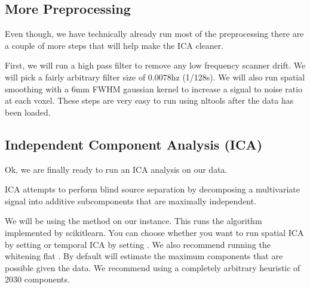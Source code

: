 \documentclass[letterpaper,10pt,english]{sphinxmanual}
\begin{document}
\subsection{More Preprocessing}
\label{\detokenize{content/ICA:more-preprocessing}}
Even though, we have technically already run most of the preprocessing there are a couple of more steps that will help make the ICA cleaner.

First, we will run a high pass filter to remove any low frequency scanner drift. We will pick a fairly arbitrary filter size of 0.0078hz (1/128s). We will also run spatial smoothing with a 6mm FWHM gaussian kernel to increase a signal to noise ratio at each voxel. These steps are very easy to run using nltools after the data has been loaded.

\begin{sphinxVerbatim}[commandchars=\\\{\}]
   

  
\end{sphinxVerbatim}


\subsection{Independent Component Analysis (ICA)}
\label{\detokenize{content/ICA:independent-component-analysis-ica}}
Ok, we are finally ready to run an ICA analysis on our data.

ICA attempts to perform blind source separation by decomposing a multivariate signal into additive subcomponents that are maximally independent.

We will be using the  method on our  instance. This runs the  algorithm implemented by scikit\sphinxhyphen{}learn. You can choose whether you want to run spatial ICA by setting  or temporal ICA by setting . We also recommend running the whitening flat . By default  will estimate the maximum components that are possible given the data. We recommend using a completely arbitrary heuristic of 20\sphinxhyphen{}30 components.
\end{document}
